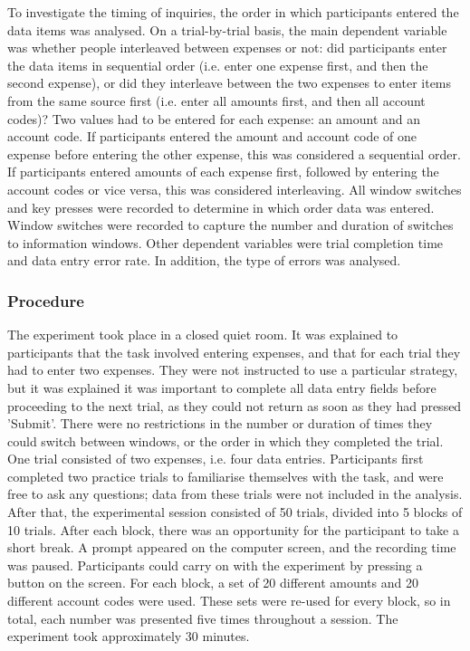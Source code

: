 To investigate the timing of inquiries, the order in which participants entered the data items was analysed. On a trial-by-trial basis, the main dependent variable was whether people interleaved between expenses or not: did participants enter the data items in sequential order (i.e. enter one expense first, and then the second expense), or did they interleave between the two expenses to enter items from the same source first (i.e. enter all amounts first, and then all account codes)? Two values had to be entered for each expense: an amount and an account code. If participants entered the amount and account code of one expense before entering the other expense, this was considered a sequential order. If participants entered amounts of each expense first, followed by entering the account codes or vice versa, this was considered interleaving. All window switches and key presses were recorded to determine in which order data was entered. Window switches were recorded to capture the number and duration of switches to information windows. Other dependent variables were trial completion time and data entry error rate. In addition, the type of errors was analysed. 

\subsubsection{Procedure}
The experiment took place in a closed quiet room. It was explained to participants that the task involved entering expenses, and that for each trial they had to enter two expenses. They were not instructed to use a particular strategy, but it was explained it was important to complete all data entry fields before proceeding to the next trial, as they could not return as soon as they had pressed 'Submit'. There were no restrictions in the number or duration of times they could switch between windows, or the order in which they completed the trial. One trial consisted of two expenses, i.e. four data entries. Participants first completed two practice trials to familiarise themselves with the task, and were free to ask any questions; data from these trials were not included in the analysis. After that, the experimental session consisted of 50 trials, divided into 5 blocks of 10 trials. After each block, there was an opportunity for the participant to take a short break. A prompt appeared on the computer screen, and the recording time was paused. Participants could carry on with the experiment by pressing a button on the screen. For each block, a set of 20 different amounts and 20 different account codes were used. These sets were re-used for every block, so in total, each number was presented five times throughout a session. The experiment took approximately 30 minutes.

